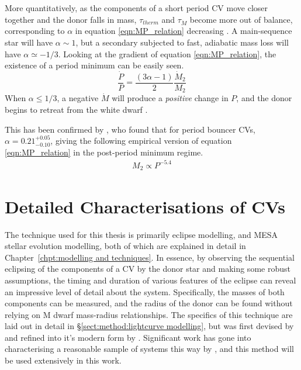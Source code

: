More quantitatively, as the components of a short period CV move closer together and the donor falls in mass, $\tau_{therm}$ and $\tau_{\dot M}$ become more out of balance, corresponding to $\alpha$ in equation \ref{eqn:MP_relation} decreasing \citep{Knigge2011b}. A main-sequence star will have $\alpha \sim 1$, but a secondary subjected to fast, adiabatic mass loss will have $\alpha \simeq -1/3$. Looking at the gradient of equation \ref{eqn:MP_relation}, the existence of a period minimum can be easily seen.
\begin{equation}
    \frac{\dot P}{P} = \frac{(3\alpha - 1)}{2} \frac{\dot M_2}{M_2}
\end{equation}
When $\alpha \le 1/3$, a negative $\dot M$ will produce a \textit{positive} change in $P$, and the donor begins to retreat from the white dwarf \citep{rezzolla2001}. 

This has been confirmed by \citet{knigge11}, who found that for period bouncer CVs, $\alpha = 0.21^{+0.05}_{-0.10}$, giving the following empirical version of equation \ref{eqn:MP_relation} in the post-period minimum regime.
\begin{align}
    M_2 \propto P^{-5.4}
\end{align}


\section{Detailed Characterisations of CVs}

The technique used for this thesis is primarily eclipse modelling, and MESA stellar evolution modelling, both of which are explained in detail in Chapter~\ref{chpt:modelling and techniques}. In essence, by observing the sequential eclipsing of the components of a CV by the donor star and making some robust assumptions, the timing and duration of various features of the eclipse can reveal an impressive level of detail about the system. Specifically, the masses of both components can be measured, and the radius of the donor can be found without relying on M dwarf mass-radius relationships. The specifics of this technique are laid out in detail in \S\ref{sect:method:lightcurve modelling}, but was first devised by \citet{wood1986} and refined into it's modern form by \citet{Savoury2011}. Significant work has gone into characterising a reasonable sample of systems this way by \citet{McAllister2019}, and this method will be used extensively in this work.


